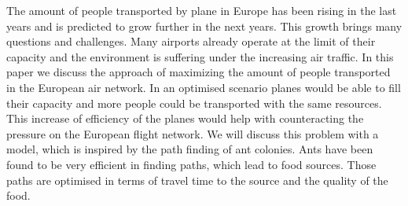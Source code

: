 The amount of people transported by plane in Europe has been rising in the last years and is predicted to grow further in the next years. This growth brings many questions and challenges. Many airports already operate at the limit of their capacity and the environment is suffering under the increasing air traffic. \cite{eurocontrol1} In this paper we discuss the approach of maximizing the amount of people transported in the European air network. In an optimised scenario planes would be able to fill their capacity and more people could be transported with the same resources. This increase of efficiency of the planes would help with counteracting the pressure on the European flight network. 
We will discuss this problem with a model, which is inspired by the path finding of ant colonies. Ants have been found to be very efficient in finding paths, which lead to food sources. Those paths are optimised in terms of travel time to the source and the quality of the food.